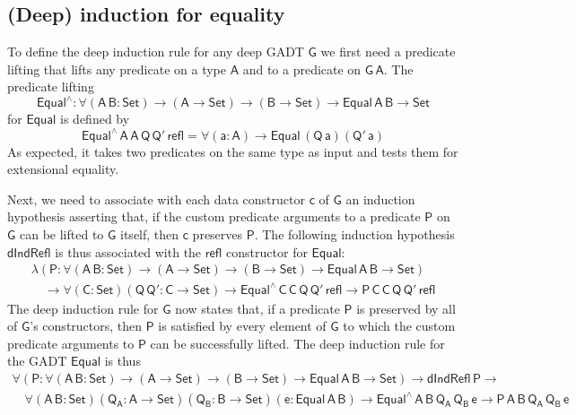 \documentclass[9pt]{entcs}
\begin{document}
\subsection{(Deep) induction for equality}\label{sec:ind-equal}

To define the deep induction rule for any deep GADT $\mathsf{G}$ we
first need a predicate lifting that lifts any predicate on a type
$\mathsf{A}$ and to a predicate on $\mathsf{G\,A}$. The predicate
lifting 
\[\mathsf{Equal^{\wedge} : \forall (A\,B : Set) \to (A \to Set) \to (B
  \to Set) \to Equal\,A\,B \to Set}\] 
for $\mathsf{Equal}$ is defined by
\[\mathsf{Equal^{\wedge}\,A\,A\,Q\,Q'\,refl = \forall (a : A) \to
  Equal\,(Q\,a)(Q'\,a)}\]
As expected, it takes two predicates on the same type as input and
tests them for extensional equality.

Next, we need to associate with each data constructor $\mathsf{c}$ of
$\mathsf{G}$ an induction hypothesis asserting that, if the custom
predicate arguments to a predicate $\mathsf{P}$ on $\mathsf{G}$ can be
lifted to $\mathsf{G}$ itself, then $\mathsf{c}$ {\color{red}
  preserves} $\mathsf{P}$. The following induction hypothesis
$\mathsf{dIndRefl}$ is thus associated with the $\mathsf{refl}$
constructor for $\mathsf{Equal}$:
\begin{equation*}\label{eq:ind-refl}
\begin{array}{l}
\mathsf{\lambda (P : \forall (A\,B : Set) \to (A \to Set) \to (B \to
  Set) \to Equal\,A\,B \to Set)} \\ 
\quad\mathsf{\to \forall (C : Set) (Q\, Q' : C \to Set) \to
  Equal^{\wedge}\,C\,C\,Q\,Q'\,refl \to P\,C\,C\,Q\,Q'\,refl} 
\end{array}
\end{equation*}
The deep induction rule for $\mathsf{G}$ now states that, if a
predicate $\mathsf{P}$ is {\color{red} preserved} by all of
$\mathsf{G}$'s constructors, then $\mathsf{P}$ is satisfied by every
element of $\mathsf{G}$ to which the custom predicate arguments to
$\mathsf{P}$ can be successfully lifted.  The deep induction rule for
the GADT $\mathsf{Equal}$ is thus
\begin{equation}\label{eq:ind-equal}
\begin{array}{l}
\mathsf{\forall (P : \forall (A\,B : Set) \to (A \to Set) \to (B \to
  Set) \to Equal\,A\,B \to Set) \to dIndRefl\,P \to}\\ \quad 
  \mathsf{\forall (A\,B : Set) (Q_A : A \to Set) (Q_B : B \to Set) (e:
  Equal\,A\,B) \to Equal^{\wedge}\,A\,B\,Q_A\,Q_B\,e \to
  P\,A\,B\,Q_A\,Q_B\,e}
\end{array}
\end{equation}
\end{document}
